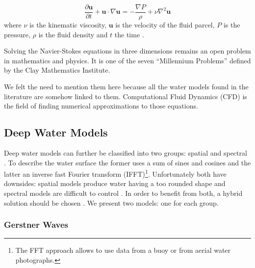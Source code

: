 \begin{equation}\label{eq:nse}
    \frac{\partial \textbf{u}}{\partial t} + \textbf{u}\cdot \nabla \textbf{u}
     = - \frac{\nabla P }{\rho} + \nu {\nabla}^2 \textbf{u}
\end{equation}
%
where $\nu$ is the kinematic viscosity, $\textbf{u}$ is the velocity of the
fluid parcel, $P$ is the pressure, $\rho$ is the fluid density and $t$ the
time \autocite{weisstein2018navier}.

Solving the Navier-Stokes equations in three dimensions remains an open problem
in mathematics and physics. It is one of the seven ``Millennium Problems''
defined by the Clay Mathematics Institute.

We felt the need to mention them here because all the water models found in the
literature are somehow linked to them. Computational Fluid Dynamics (CFD) is the
field of finding numerical approximations to those equations. 


\subsection{Deep Water Models}\label{subsec:deep_water}
Deep water models can further be classified into two groups: spatial and
spectral \autocite{darles2011survey}. To describe the water surface the former
uses a sum of sines and cosines and the latter an inverse fast Fourier transform
(IFFT)\footnote{The FFT approach allows to use data from a buoy or from aerial
water photographs.}. Unfortunately both have downsides: spatial models produce
water having a too rounded shape and spectral models are difficult to control
\autocite{darles2011survey}. In order to benefit from both, a hybrid solution
should be chosen \autocite{darles2011survey}. We present two models: one for
each group.

\subsubsection{Gerstner Waves}\label{subsub:gerstner}

